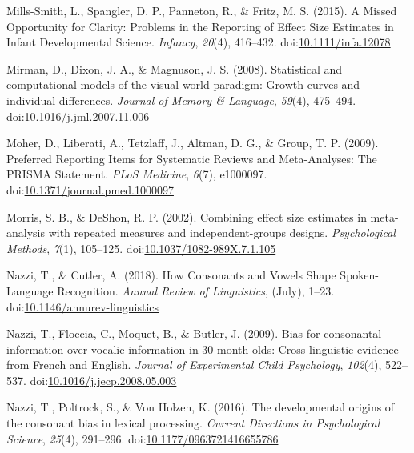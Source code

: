 \documentclass[man]{apa6}
\begin{document}
\leavevmode\hypertarget{ref-Mills-Smith2015}{}%
Mills-Smith, L., Spangler, D. P., Panneton, R., \& Fritz, M. S. (2015). A Missed Opportunity for Clarity: Problems in the Reporting of Effect Size Estimates in Infant Developmental Science. \emph{Infancy}, \emph{20}(4), 416--432. doi:\href{https://doi.org/10.1111/infa.12078}{10.1111/infa.12078}

\leavevmode\hypertarget{ref-Mirman2008}{}%
Mirman, D., Dixon, J. A., \& Magnuson, J. S. (2008). Statistical and computational models of the visual world paradigm: Growth curves and individual differences. \emph{Journal of Memory \& Language}, \emph{59}(4), 475--494. doi:\href{https://doi.org/10.1016/j.jml.2007.11.006}{10.1016/j.jml.2007.11.006}

\leavevmode\hypertarget{ref-Moher2009}{}%
Moher, D., Liberati, A., Tetzlaff, J., Altman, D. G., \& Group, T. P. (2009). Preferred Reporting Items for Systematic Reviews and Meta-Analyses: The PRISMA Statement. \emph{PLoS Medicine}, \emph{6}(7), e1000097. doi:\href{https://doi.org/10.1371/journal.pmed.1000097}{10.1371/journal.pmed.1000097}

\leavevmode\hypertarget{ref-morris2002combining}{}%
Morris, S. B., \& DeShon, R. P. (2002). Combining effect size estimates in meta-analysis with repeated measures and independent-groups designs. \emph{Psychological Methods}, \emph{7}(1), 105--125. doi:\href{https://doi.org/10.1037/1082-989X.7.1.105}{10.1037/1082-989X.7.1.105}

\leavevmode\hypertarget{ref-Nazzi2018}{}%
Nazzi, T., \& Cutler, A. (2018). How Consonants and Vowels Shape Spoken-Language Recognition. \emph{Annual Review of Linguistics}, (July), 1--23. doi:\href{https://doi.org/10.1146/annurev-linguistics}{10.1146/annurev-linguistics}

\leavevmode\hypertarget{ref-Nazzi2009a}{}%
Nazzi, T., Floccia, C., Moquet, B., \& Butler, J. (2009). Bias for consonantal information over vocalic information in 30-month-olds: Cross-linguistic evidence from French and English. \emph{Journal of Experimental Child Psychology}, \emph{102}(4), 522--537. doi:\href{https://doi.org/10.1016/j.jecp.2008.05.003}{10.1016/j.jecp.2008.05.003}

\leavevmode\hypertarget{ref-Nazzi2016}{}%
Nazzi, T., Poltrock, S., \& Von Holzen, K. (2016). The developmental origins of the consonant bias in lexical processing. \emph{Current Directions in Psychological Science}, \emph{25}(4), 291--296. doi:\href{https://doi.org/10.1177/0963721416655786}{10.1177/0963721416655786}
\end{document}
